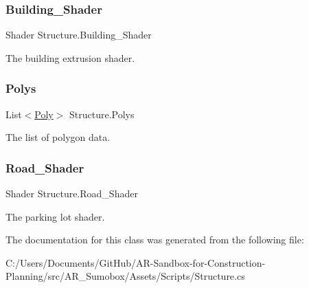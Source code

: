 \subsubsection{\texorpdfstring{Building\_Shader}{Building\_Shader}}
{\footnotesize\ttfamily Shader Structure.\+Building\+\_\+\+Shader}



The building extrusion shader. 

\mbox{\label{class_structure_a45d7defe9341ce74797d6fd86a6ed45f}} 
\subsubsection{\texorpdfstring{Polys}{Polys}}
{\footnotesize\ttfamily List$<$\mbox{\hyperlink{struct_poly}{Poly}}$>$ Structure.\+Polys}



The list of polygon data. 

\mbox{\label{class_structure_a782bbfbf7bbb02c511a9f90e29c3e152}} 
\subsubsection{\texorpdfstring{Road\_Shader}{Road\_Shader}}
{\footnotesize\ttfamily Shader Structure.\+Road\+\_\+\+Shader}



The parking lot shader. 



The documentation for this class was generated from the following file\+:\begin{DoxyCompactItemize}
\item 
C\+:/\+Users/\+Documents/\+Git\+Hub/\+A\+R-\/\+Sandbox-\/for-\/\+Construction-\/\+Planning/src/\+A\+R\+\_\+\+Sumobox/\+Assets/\+Scripts/Structure.\+cs\end{DoxyCompactItemize}
